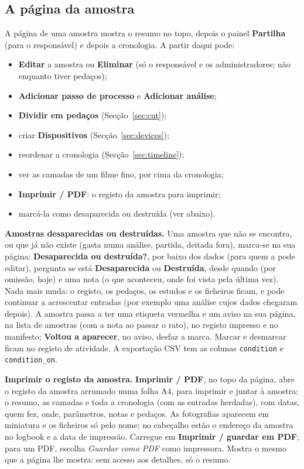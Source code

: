 \documentclass[11pt,a4paper]{article}
\newcommand{\ui}[1]{\textsf{\textbf{#1}}}
\begin{document}
\subsection{A página da amostra}

A página de uma amostra mostra o resumo no topo, depois o painel
\ui{Partilha} (para o responsável) e depois a cronologia. A partir daqui
pode:
\begin{itemize}
  \item \ui{Editar} a amostra ou \ui{Eliminar} (só o responsável e os
        administradores; não enquanto tiver pedaços);
  \item \ui{Adicionar passo de processo} e \ui{Adicionar análise};
  \item \ui{Dividir em pedaços} (Secção~\ref{sec:cut});
  \item criar \ui{Dispositivos} (Secção~\ref{sec:devices});
  \item reordenar a cronologia (Secção~\ref{sec:timeline});
  \item ver as camadas de um filme fino, por cima da cronologia;
  \item \ui{Imprimir / PDF}: o registo da amostra para imprimir;
  \item marcá-la como desaparecida ou destruída (ver abaixo).
\end{itemize}

\textbf{Amostras desaparecidas ou destruídas.} Uma amostra que não se encontra,
ou que já não existe (gasta numa análise, partida, deitada fora), marca-se na
sua página: \ui{Desaparecida ou destruída?}, por baixo dos dados (para quem a
pode editar), pergunta se está \ui{Desaparecida} ou \ui{Destruída}, desde
quando (por omissão, hoje) e uma nota (o que aconteceu, onde foi vista pela
última vez). Nada mais muda: o registo, os pedaços, os estudos e os ficheiros
ficam, e pode continuar a acrescentar entradas (por exemplo uma análise cujos
dados chegaram depois). A amostra passa a ter uma etiqueta vermelha e um aviso
na sua página, na lista de amostras (com a nota ao passar o rato), no registo
impresso e no manifesto; \ui{Voltou a aparecer}, no aviso, desfaz a marca.
Marcar e desmarcar ficam no registo de atividade. A exportação CSV tem as
colunas \texttt{condition} e \texttt{condition\_on}.

\textbf{Imprimir o registo da amostra.} \ui{Imprimir / PDF}, no topo da
página, abre o registo da amostra arrumado numa folha A4, para imprimir e
juntar à amostra: o resumo, as camadas e toda a cronologia (com as entradas
herdadas), com datas, quem fez, onde, parâmetros, notas e pedaços. As
fotografias aparecem em miniatura e os ficheiros só pelo nome; no cabeçalho
estão o endereço da amostra no logbook e a data de impressão. Carregue em
\ui{Imprimir / guardar em PDF}; para um PDF, escolha \emph{Guardar como PDF}
como impressora. Mostra o mesmo que a página lhe mostra: sem acesso aos
detalhes, só o resumo.
\end{document}
